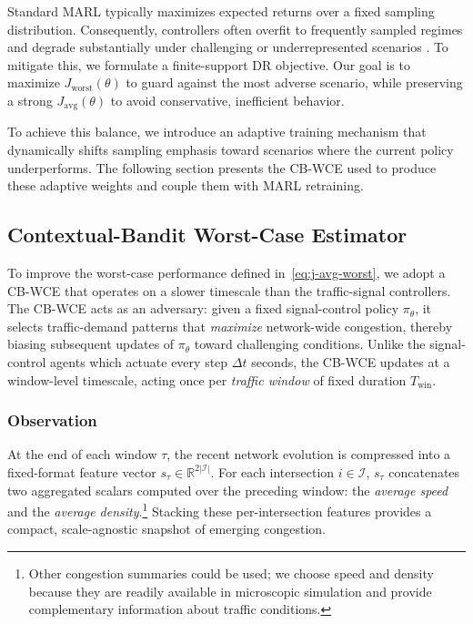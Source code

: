 \documentclass[lettersize,journal]{IEEEtran}
\begin{document}
Standard MARL typically maximizes expected returns over a fixed sampling distribution. Consequently, controllers often overfit to frequently sampled regimes and degrade substantially under challenging or underrepresented scenarios \cite{huang2026robustefficientmultiagentreinforcement}. To mitigate this, we formulate a finite-support DR objective. Our goal is to maximize $J_{\mathrm{worst}}(\theta)$ to guard against the most adverse scenario, while preserving a strong $J_{\mathrm{avg}}(\theta)$ to avoid conservative, inefficient behavior. 

To achieve this balance, we introduce an adaptive training mechanism that dynamically shifts sampling emphasis toward scenarios where the current policy underperforms. The following section presents the CB-WCE used to produce these adaptive weights and couple them with MARL retraining.

\subsection{Contextual-Bandit Worst-Case Estimator}
\label{subsec:cb-estimator}

To improve the worst-case performance defined in~\eqref{eq:j-avg-worst}, we adopt a CB-WCE that operates on a slower timescale than the traffic-signal controllers. The CB-WCE acts as an adversary: given a fixed signal-control policy $\pi_\theta$, it selects traffic-demand patterns that \emph{maximize} network-wide congestion, thereby biasing subsequent updates of $\pi_\theta$ toward challenging conditions. Unlike the signal-control agents which actuate every step $\Delta t$ seconds, the CB-WCE updates at a window-level timescale, acting once per \emph{traffic window} of fixed duration $T_{\mathrm{win}}$.
\subsubsection{Observation}
\label{subsubsec:wce_observation}

 At the end of each window $\tau$, the recent network evolution is compressed into a fixed-format feature vector
\(
s_\tau \in \mathbb{R}^{2|\mathcal{I}|}.
\) 
For each intersection $i\in\mathcal{I}$, $s_\tau$ concatenates two aggregated scalars computed over the preceding window: the \emph{average speed} and the \emph{average density}.\footnote{Other congestion summaries could be used; we choose speed and density because they are readily available in microscopic simulation and provide complementary information about traffic conditions.} Stacking these per-intersection features provides a compact, scale-agnostic snapshot of emerging congestion.
\end{document}
